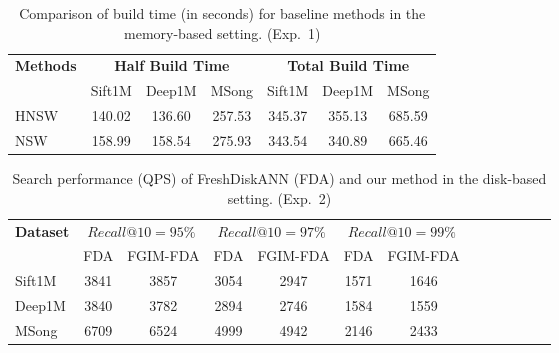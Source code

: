 \documentclass[acmsmall]{acmart}
\theoremstyle{remark}
\theoremstyle{definition}
\begin{document}
\begin{table}[t]
	\small
	\centering
	\caption{Comparison of build time (in seconds) for baseline methods in the memory-based setting. (Exp.~1)}
	\vspace{-1ex}
	\begin{tabular}{lcccccc}
		\toprule
		\multirow{2}{*}{\textbf{Methods}} & \multicolumn{3}{c}{\textbf{Half Build Time}} & \multicolumn{3}{c}{\textbf{Total Build Time}} \\
		\cmidrule(lr){2-4} \cmidrule(lr){5-7}
		& {Sift1M} & {Deep1M} & {MSong} & {Sift1M} & {Deep1M} & {MSong} \\
		\midrule
		HNSW & 140.02 & 136.60 & 257.53 & 345.37 & 355.13 & 685.59 \\
		NSW  & 158.99 & 158.54 & 275.93 & 343.54 & 340.89 & 665.46 \\
		\bottomrule
	\end{tabular}
	\label{tab:baseline_build_time}
	\vspace{-1ex}
\end{table}

\begin{table}[t]
	\small
	\centering
	\caption{Search performance (QPS) of FreshDiskANN (FDA) and our method in the disk-based setting. (Exp.~2)}
	\vspace{-1ex}
	\begin{tabular}{lcccccccccccc}
		\toprule
		\multirow{2}{*}{\textbf{Dataset}} & \multicolumn{2}{c}{\textbf{$Recall@10=95\%$}} & \multicolumn{2}{c}{\textbf{$Recall@10=97\%$}} & \multicolumn{2}{c}{\textbf{$Recall@10=99\%$}} \\
		\cmidrule(lr){2-3} \cmidrule(lr){4-5} \cmidrule(lr){6-7}
		& {FDA} & {FGIM-FDA} & {FDA} & {FGIM-FDA} & {FDA} & {FGIM-FDA} \\
		\midrule
		Sift1M & 3841 & 3857 & 3054 & 2947 & 1571 & 1646 \\
		Deep1M & 3840 & 3782 & 2894 & 2746 & 1584 & 1559 \\
		MSong & 6709 & 6524 & 4999 & 4942 & 2146 & 2433 \\
		\bottomrule
	\end{tabular}
	\label{tab:disk_qps}
	\vspace{-1ex}
\end{table}
\end{document}
